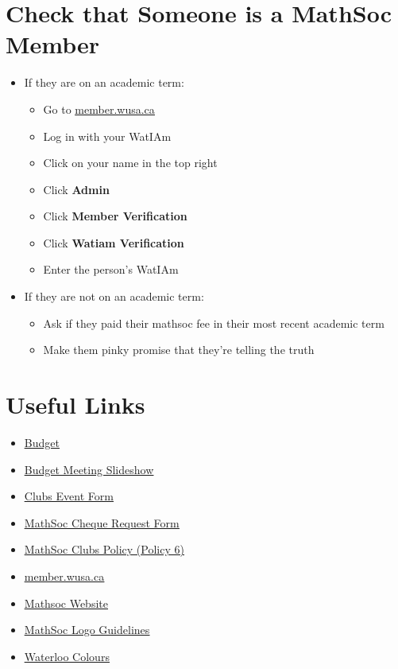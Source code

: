 \documentclass[utf8]{article}
\renewcommand{\labelitemi}{$\square$}
\newcommand{\budget}{\href{https://drive.google.com/file/d/1uQIh7Qp33NX0TgJhl3DdY-r2HqZzQKuZ/view}{\underline{Budget} }}
\newcommand{\budgetSlideshow}{\href{https://docs.google.com/presentation/d/1STBZmvycCzdxlngaaHDIre7LndTr-057gBXYInwFuVg/edit?usp=sharing}{\underline{Budget Meeting Slideshow} }}
\newcommand{\clubsEventForm}{\href{https://wusa.ca/clubs/clubs-important-forms/clubs-event-form/done?sid=41744&token=1a166c8e45c6113b0322bd3e34fa6fb4}{\underline{Clubs Event Form} }}
\newcommand{\chequeReimbursementForm}{\href{https://mathsoc.uwaterloo.ca/wp-content/uploads/2021/02/Club-Cheque-Request-Form.pdf}{\underline{MathSoc Cheque Request Form} }}
\newcommand{\mathsocClubPolicy}{\href{https://mathsoc.uwaterloo.ca/wp-content/uploads/Mathsoc_Policies-1.pdf}{\underline{MathSoc Clubs Policy (Policy 6)} }}
\newcommand{\membersite}{\href{https://member.wusa.ca/}{\underline{member.wusa.ca}}}
\newcommand{\mathsocsite}{\href{https://mathsoc.uwaterloo.ca/}{\underline{Mathsoc Website}}}
\newcommand{\mathsoclogo}{\href{https://drive.google.com/drive/folders/18v8yaagA74DqMqXaffVm3BGyS8Ze9e5m}{\underline{MathSoc Logo Guidelines}}}
\newcommand{\colorbrand}{\href{https://uwaterloo.ca/brand/how-express-waterloos-brand/colour}{\underline{Waterloo Colours}}}
\begin{document}
\section*{Check that Someone is a MathSoc Member}
\label{sec:membership}
\begin{itemize}
    \item If they are on an academic term:
    \begin{itemize}
        \item Go to \membersite
        \item Log in with your WatIAm
        \item Click on your name in the top right
        \item Click \textbf{Admin}
        \item Click \textbf{Member Verification}
        \item Click \textbf{Watiam Verification}
        \item Enter the person's WatIAm 
    \end{itemize}
    \item If they are not on an academic term:
    \begin{itemize}
        \item Ask if they paid their mathsoc fee in their most recent academic term
        \item Make them pinky promise that they're telling the truth
    \end{itemize}
\end{itemize}

\renewcommand\labelitemi{\textbullet}
\section*{Useful Links}
\label{sec:otherresources}
\begin{itemize}
    \item \budget
    \item \budgetSlideshow
    \item \clubsEventForm
    \item \chequeReimbursementForm
    \item \mathsocClubPolicy
    \item \membersite
    \item \mathsocsite
    \item \mathsoclogo
    \item \colorbrand
\end{itemize}
\end{document}
